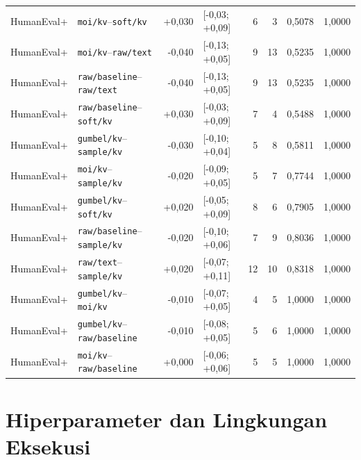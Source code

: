 \begin{longtable}{llrlrrrr}
HumanEval+ & \texttt{moi/kv}--\texttt{soft/kv} & +0,030 & [-0,03; +0,09] & 6 & 3 & 0,5078 & 1,0000 \\
HumanEval+ & \texttt{moi/kv}--\texttt{raw/text} & -0,040 & [-0,13; +0,05] & 9 & 13 & 0,5235 & 1,0000 \\
HumanEval+ & \texttt{raw/baseline}--\texttt{raw/text} & -0,040 & [-0,13; +0,05] & 9 & 13 & 0,5235 & 1,0000 \\
HumanEval+ & \texttt{raw/baseline}--\texttt{soft/kv} & +0,030 & [-0,03; +0,09] & 7 & 4 & 0,5488 & 1,0000 \\
HumanEval+ & \texttt{gumbel/kv}--\texttt{sample/kv} & -0,030 & [-0,10; +0,04] & 5 & 8 & 0,5811 & 1,0000 \\
HumanEval+ & \texttt{moi/kv}--\texttt{sample/kv} & -0,020 & [-0,09; +0,05] & 5 & 7 & 0,7744 & 1,0000 \\
HumanEval+ & \texttt{gumbel/kv}--\texttt{soft/kv} & +0,020 & [-0,05; +0,09] & 8 & 6 & 0,7905 & 1,0000 \\
HumanEval+ & \texttt{raw/baseline}--\texttt{sample/kv} & -0,020 & [-0,10; +0,06] & 7 & 9 & 0,8036 & 1,0000 \\
HumanEval+ & \texttt{raw/text}--\texttt{sample/kv} & +0,020 & [-0,07; +0,11] & 12 & 10 & 0,8318 & 1,0000 \\
HumanEval+ & \texttt{gumbel/kv}--\texttt{moi/kv} & -0,010 & [-0,07; +0,05] & 4 & 5 & 1,0000 & 1,0000 \\
HumanEval+ & \texttt{gumbel/kv}--\texttt{raw/baseline} & -0,010 & [-0,08; +0,05] & 5 & 6 & 1,0000 & 1,0000 \\
HumanEval+ & \texttt{moi/kv}--\texttt{raw/baseline} & +0,000 & [-0,06; +0,06] & 5 & 5 & 1,0000 & 1,0000 \\
\hline
\end{longtable}



\chapter{Hiperparameter dan Lingkungan Eksekusi}
\label{lamp:hparam}

